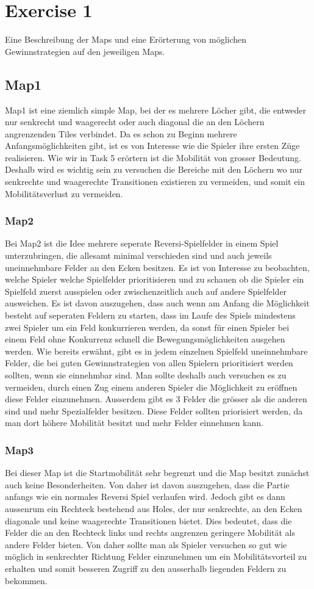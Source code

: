 \section{Exercise 1}
Eine Beschreibung der Maps und eine Erörterung von möglichen Gewinnstrategien auf den jeweiligen Maps.
\subsection{Map1}
Map1 ist eine ziemlich simple Map, bei der es mehrere Löcher gibt, die entweder nur senkrecht und waagerecht oder auch diagonal die an den Löchern angrenzenden Tiles verbindet. 
Da es schon zu Beginn mehrere Anfangsmöglichkeiten gibt, ist es von Interesse wie die Spieler ihre ersten Züge realisieren. 
Wie wir in Task 5 erörtern ist die Mobilität von grosser Bedeutung. Deshalb wird es wichtig sein zu versuchen die Bereiche mit den Löchern wo nur senkrechte und waagerechte Transitionen existieren zu vermeiden, und somit ein Mobilitätsverlust zu vermeiden.
\subsubsection{Map2}
Bei Map2 ist die Idee mehrere seperate Reversi-Spielfelder in einem Spiel unterzubringen, die allesamt minimal verschieden sind und auch jeweils uneinnehmbare Felder an den Ecken besitzen.
Es ist von Interesse zu beobachten, welche Spieler welche Spielfelder prioritisieren und zu schauen ob die Spieler ein Spielfeld zuerst ausspielen oder zwischenzeitlich auch auf andere Spielfelder ausweichen.
Es ist davon auszugehen, dass auch wenn am Anfang die Möglichkeit besteht auf seperaten Feldern zu starten, dass im Laufe des Spiels mindestens zwei Spieler um ein Feld konkurrieren werden, da sonst für einen Spieler bei einem Feld ohne Konkurrenz schnell die Bewegungsmöglichkeiten ausgehen werden.
Wie bereits erwähnt, gibt es in jedem einzelnen Spielfeld uneinnehmbare Felder, die bei guten Gewinnstrategien von allen Spielern prioritisiert werden sollten, wenn sie einnehmbar sind. 
Man sollte deshalb auch versuchen es zu vermeiden, durch einen Zug einem anderen Spieler die Möglichkeit zu eröffnen diese Felder einzunehmen.
Ausserdem gibt es 3 Felder die grösser als die anderen sind und mehr Spezialfelder besitzen. Diese Felder sollten priorisiert werden, da man dort höhere Mobilität besitzt und mehr Felder einnehmen kann.
\subsubsection{Map3}
Bei dieser Map ist die Startmobilität sehr begrenzt und die Map besitzt zunächst auch keine Besonderheiten. Von daher ist davon auszugehen, dass die Partie anfangs wie ein normales Reversi Spiel verlaufen wird.
Jedoch gibt es dann aussenrum ein Rechteck bestehend aus Holes, der nur senkrechte, an den Ecken diagonale und keine waagerechte Transitionen bietet. Dies bedeutet, dass die Felder die an den Rechteck links und rechts angrenzen geringere Mobilität als andere Felder bieten.
Von daher sollte man als Spieler versuchen so gut wie möglich in senkrechter Richtung Felder einzunehmen um ein Mobilitätsvorteil zu erhalten und somit besseren Zugriff zu den ausserhalb liegenden Feldern zu bekommen.